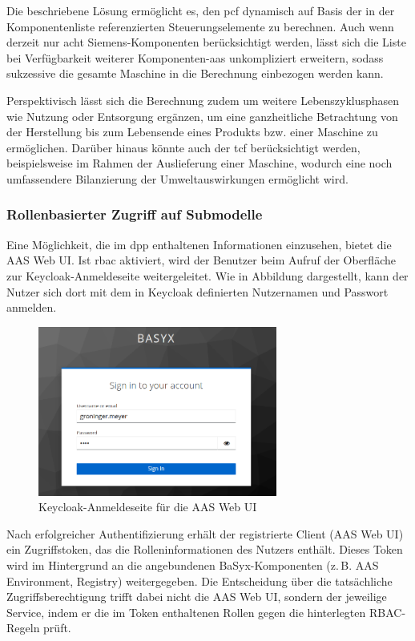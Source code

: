 Die beschriebene Lösung ermöglicht es, den \acs{pcf} dynamisch auf Basis der in der Komponentenliste referenzierten Steuerungselemente zu berechnen. 
Auch wenn derzeit nur acht Siemens-Komponenten berücksichtigt werden, lässt sich die Liste bei Verfügbarkeit weiterer Komponenten-\acs{aas} unkompliziert erweitern, sodass sukzessive die gesamte Maschine in die Berechnung einbezogen werden kann.

Perspektivisch lässt sich die Berechnung zudem um weitere Lebenszyklusphasen wie Nutzung oder Entsorgung ergänzen, um eine ganzheitliche Betrachtung von der Herstellung bis zum Lebensende eines Produkts bzw. einer Maschine zu ermöglichen.
Darüber hinaus könnte auch der \acs{tcf} berücksichtigt werden, beispielsweise im Rahmen der Auslieferung einer Maschine, wodurch eine noch umfassendere Bilanzierung der Umweltauswirkungen ermöglicht wird.

\subsubsection{Rollenbasierter Zugriff auf Submodelle}
Eine Möglichkeit, die im \acs{dpp} enthaltenen Informationen einzusehen, bietet die AAS Web UI. 
Ist \acs{rbac} aktiviert, wird der Benutzer beim Aufruf der Oberfläche zur Keycloak-Anmeldeseite weitergeleitet. 
Wie in Abbildung dargestellt, kann der Nutzer sich dort mit dem in Keycloak definierten Nutzernamen und Passwort anmelden.

\begin{figure}[htbp]
    \centering
        \includegraphics[width=0.7\textwidth]{Bilder/Ergebnisse/DPP/KeycloakAnmeldeSeite.png}
    
    \caption{Keycloak-Anmeldeseite für die AAS Web UI}
    \label{fig:SequenzdiagrammPCF}
\end{figure}

Nach erfolgreicher Authentifizierung erhält der registrierte Client (AAS Web UI) ein Zugriffstoken, das die Rolleninformationen des Nutzers enthält.  
Dieses Token wird im Hintergrund an die angebundenen BaSyx-Komponenten (z.\,B. AAS Environment, Registry) weitergegeben.  
Die Entscheidung über die tatsächliche Zugriffsberechtigung trifft dabei nicht die AAS Web UI, sondern der jeweilige Service, indem er die im Token enthaltenen Rollen gegen die hinterlegten RBAC-Regeln prüft.

